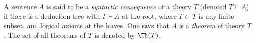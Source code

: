 

\setcounter{section}{3}
\setcounter{subsection}{2}
\setcounter{dfn}{13}

\begin{dfn}
A sentence $A$ is said to be a \emph{syntactic consequence} of a theory $T$ (denoted $T \vdash A$) if
there is a deduction tree with $\Gamma \vdash A$ at the root, where $\Gamma \subset T$ is any finite subset, and logical axioms at the leaves.
One says that $A$ is a \emph{theorem} of theory $T$.
The set of all theorems of $T$ is denoted by $\Th(T)$.
\end{dfn}



